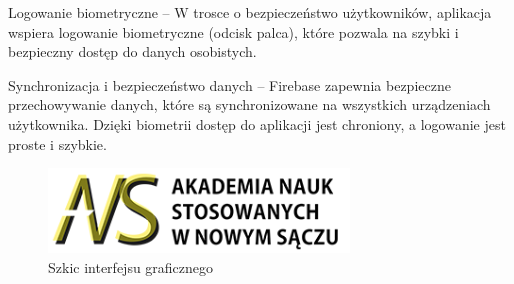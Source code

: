     Logowanie biometryczne – W trosce o bezpieczeństwo użytkowników, aplikacja wspiera logowanie biometryczne (odcisk palca), które pozwala na szybki i bezpieczny dostęp do danych osobistych.

    Synchronizacja i bezpieczeństwo danych – Firebase zapewnia bezpieczne przechowywanie danych, które są synchronizowane na wszystkich urządzeniach użytkownika. Dzięki biometrii dostęp do aplikacji jest chroniony, a logowanie jest proste i szybkie.





	\begin{figure}[!htb]
	\begin{center}
		\includegraphics[width=8cm]{rys/ans.png}
		\caption{Szkic interfejsu graficznego}
		\label{rys:rysunek001}
	\end{center}
\end{figure}








